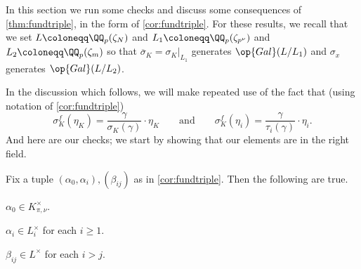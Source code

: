 In this section we run some checks and discuss some consequences of \autoref{thm:fundtriple}, in the form of \autoref{cor:fundtriple}. For these results, we recall that we set $L\coloneqq\QQ_p(\zeta_N)$ and $L_1\coloneqq\QQ_p(\zeta_{p^\nu})$ and $L_2\coloneqq\QQ_p(\zeta_m)$ so that $\overline\sigma_K=\sigma_K|_{L_1}$ generates $\op{Gal}(L/L_1)$ and $\sigma_x$ generates $\op{Gal}(L/L_2)$.

In the discussion which follows, we will make repeated use of the fact that (using notation of \autoref{cor:fundtriple})
\[\sigma_K^f\left(\eta_K\right)=\frac{\gamma}{\sigma_K(\gamma)}\cdot \eta_K\qquad\text{and}\qquad\sigma_K^f\left(\eta_i\right)=\frac\gamma{\tau_i(\gamma)}\cdot \eta_i.\]
And here are our checks; we start by showing that our elements are in the right field.
\begin{lemma}
	Fix a tuple $(\alpha_0,\alpha_i),(\beta_{ij})$ as in \autoref{cor:fundtriple}. Then the following are true.
	\begin{listalph}
		\item $\alpha_0\in K_{\pi,\nu}^\times$.
		\item $\alpha_i\in L_i^\times$ for each $i\ge1$.
		\item $\beta_{ij}\in L^\times$ for each $i>j$.
	\end{listalph}
\end{lemma}
